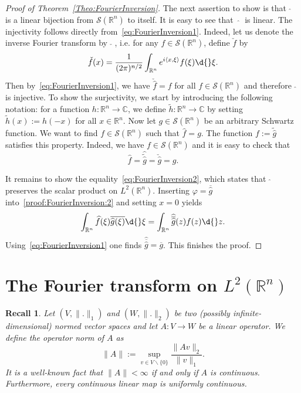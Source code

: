 \documentclass[12pt, oneside, a4paper]{article}
\theoremstyle{dfn}
\newtheorem{recall}{Recall}
\newcommand{\scalprod}[2]{\langle #1,#2 \rangle}
\def \S {\ensuremath{\mathcal{S}}}
\def \S {\ensuremath{\mathcal{S}}}
\def\Rbb{\ensuremath{\mathbb{R}}}
\providecommand{\norm}[1]{\lVert#1\rVert}
\newcommand{\Com}{\mathbb{C}}
\begin{document}
\begin{proof}[Proof of Theorem~\ref{Theo:FourierInversion}]
The next assertion to show is that $\;\widehat{}\;$ is a linear bijection from $\S(\Rbb^n)$ to itself.
It is easy to see that~$\;\widehat{}\;$ is linear.
The injectivity follows directly from~\eqref{eq:FourierInversion1}. Indeed, let us denote the inverse Fourier transform by $\;\check{}\;$, i.e. for any $f \in \S(\Rbb^n)$, define $\check{f}$ by
\[
\check{f}(x) = \frac{1}{(2\pi)^{n/2}} \int_{\Rbb^n} e^{i\scalprod{x}{\xi}} f(\xi) \d{}\xi.
\]
Then by~\eqref{eq:FourierInversion1}, we have $\check{\widehat{f}} = f$ for all $f \in \S(\Rbb^n)$ and therefore $\;\widehat{}\;$ is injective.
To show the surjectivity, we start by introducing the following notation: for a function $h \colon \Rbb^n \to \Com$, we define $\widetilde{h} \colon \Rbb^n \to \Com$ by setting $\widetilde{h}(x) := h(-x)$ for all $x \in \Rbb^n$. Now let $g \in \S(\Rbb^n)$ be an arbitrary Schwartz function. We want to find $f \in \S(\Rbb^n)$ such that $\widehat{f} = g$. The function $f := \widetilde{\widehat{g}}$ satisfies this property. Indeed, we have $f \in \S(\Rbb^n)$ and it is easy to check that
\[
\widehat{f} = \widehat{\widetilde{\widehat{g}}} = \check{\widehat{g}} = g.
\]

It remains to show the equality~\eqref{eq:FourierInversion2}, which states that $\;\widehat{}\;$ preserves the scalar product on $L^2(\Rbb^n)$. Inserting $\varphi = \overline{\widehat{g}}$ into~\eqref{proof:FourierInversion:2} and setting $x = 0$ yields
\[
\int_{\Rbb^n} \widehat{f}(\xi) \overline{\widehat{g}(\xi)} \d{}\xi
= \int_{\Rbb^n} \widehat{\overline{\widehat{g}}}(z) f(z) \d{}z.
\]
Using~\eqref{eq:FourierInversion1} one finds $\widehat{\overline{\widehat{g}}} = \overline{g}$. This finishes the proof.
\end{proof}

\section{The Fourier transform on $L^2(\Rbb^n)$}

\begin{recall}
Let $(V,\norm{.}_1)$ and $(W,\norm{.}_2)$ be two (possibly infinite-dimensional) normed vector spaces and let $A \colon V \to W$ be a linear operator. We define the operator norm of $A$ as
\[
\norm{A} := \sup_{v \in V \smallsetminus \{0\}} \frac{\norm{Av}_2}{\norm{v}_1}.
\]
It is a well-known fact that $\norm{A} < \infty$ if and only if $A$ is continuous. Furthermore, every continuous linear map is uniformly continuous.




\end{recall}
\end{document}
